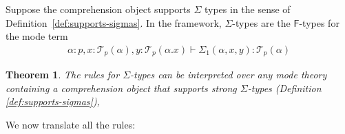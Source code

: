 \documentclass[10pt]{article}
\newtheorem{theorem}{Theorem}
\theoremstyle{definition}
\newcommand{\yields}{\vdash}
\newcommand\El[2]{\mathcal{T}_{#1}(#2)}
\begin{document}
Suppose the comprehension object supports $\Sigma$ types in the sense of Definition~\ref{def:supports-sigmas}. In the framework, $\Sigma$-types are the $\mathsf{F}$-types for the mode term
\begin{align*}
\alpha : p, x : \El{p}{\alpha}, y : \El{p}{\alpha.x} \yields \Sigma_1(\alpha,x,y) : \El{p}{\alpha}
\end{align*}

\begin{theorem}
The rules for $\Sigma$-types can be interpreted over any mode theory containing a comprehension object that supports strong $\Sigma$-types (Definition \ref{def:supports-sigmas}), 
\end{theorem}

We now translate all the rules:
\end{document}
